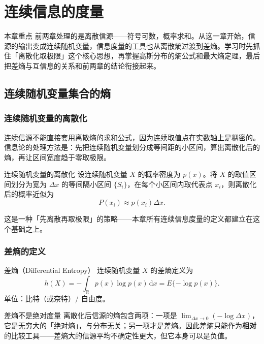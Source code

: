 \section{连续信息的度量}

\begin{remarkBox}{本章重点}
前两章处理的是离散信源——符号可数，概率求和。从这一章开始，信源的输出变成连续随机变量，信息度量的工具也从离散熵过渡到差熵。学习时先抓住「离散化取极限」这个核心思想，再掌握高斯分布的熵公式和最大熵定理，最后把差熵与互信息的关系和前两章的结论衔接起来。
\end{remarkBox}

\subsection{连续随机变量集合的熵}

\subsubsection{连续随机变量的离散化}
连续信源不能直接套用离散熵的求和公式，因为连续取值点在实数轴上是稠密的。信息论的处理方法是：先把连续随机变量划分成等间距的小区间，算出离散化后的熵，再让区间宽度趋于零取极限。

\begin{definitionBox}{连续随机变量的离散化}
设连续随机变量 $X$ 的概率密度为 $p(x)$。将 $X$ 的取值区间划分为宽为 $\Delta x$ 的等间隔小区间 $\{S_i\}$，在每个小区间内取代表点 $x_i$，则离散化后的概率近似为
\[
P(x_i)\approx p(x_i)\Delta x.
\]
\end{definitionBox}

这是一种「先离散再取极限」的策略——本章所有连续信息度量的定义都建立在这个基础之上。

\subsubsection{差熵的定义}

\begin{definitionBox}{差熵（Differential Entropy）}
连续随机变量 $X$ 的差熵定义为
\[
h(X)=-\int_{\mathbb{R}}p(x)\log p(x)\,\mathrm{d}x
      =E\{-\log p(x)\}.
\]
单位：比特（或奈特）/ 自由度。
\end{definitionBox}

\begin{warningBox}{差熵不是绝对度量}
离散化后信源的熵包含两项：一项是 $\lim_{\Delta x\to 0}(-\log\Delta x)$，它是无穷大的「绝对熵」，与分布无关；另一项才是差熵。因此差熵只能作为\textbf{相对}的比较工具——差熵大的信源平均不确定性更大，但它本身可以是负值。
\end{warningBox}

